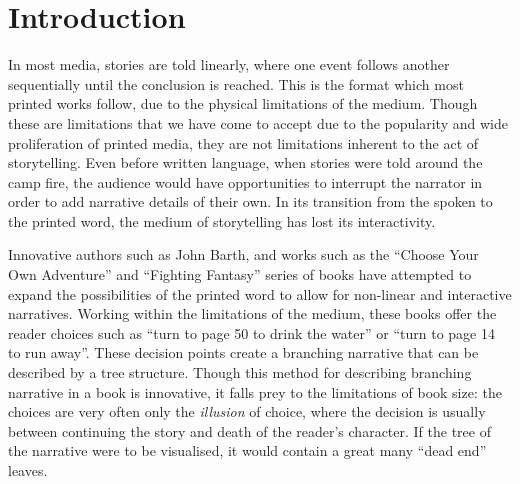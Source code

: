 \documentclass[11pt]{report}
\def\mnote#1{\todo[color=Goldenrod,size=\scriptsize]{Matt: #1}}
\begin{document}


\chapter{Introduction}
\label{cha:introduction}

In most media, stories are told linearly, where one event follows another
sequentially until the conclusion is reached. This is the format which most
printed works follow, due to the physical limitations of the medium. Though
these are limitations
that we have come to accept due to the popularity and wide proliferation of
printed media, they are not limitations inherent to the act of storytelling. Even
before written language, when stories were told around the camp fire, the
audience would have opportunities to interrupt the narrator in order to add
narrative details of their own. In its transition from the spoken to the printed
word, the medium of storytelling has lost its interactivity.

Innovative authors such as John Barth, and works such as the ``Choose Your Own Adventure'' and
``Fighting Fantasy'' series of books have attempted to expand the possibilities
of the printed word to allow for non-linear and interactive narratives. Working
within the limitations of the medium, these books offer the reader choices such
as ``turn to page 50 to drink the water'' or ``turn to page 14 to run away''.
These decision points create a branching narrative that can be described by a
tree structure. Though this method for describing branching narrative in a book
is innovative, it falls prey to the limitations of book size: the choices are
very often only the \emph{illusion} of choice, where the decision is usually
between continuing the story and death of the reader's character. If the tree of the narrative were to be
visualised, it would contain a great many ``dead end'' leaves.
\end{document}
